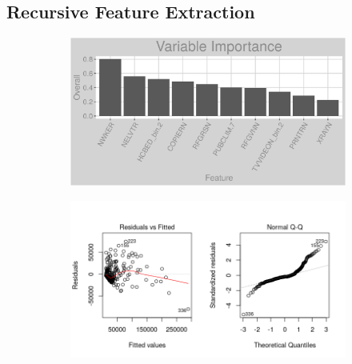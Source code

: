 \subsection{Recursive Feature Extraction}
\label{appendix:district_heat:rfe}
\begin{figure}[h]
\centering
\begin{subfigure}{1\textwidth}
\centering
\includegraphics[width=.99\textwidth, height=0.3\textheight]{Images/district_heat_rfe_vars.png}
\end{subfigure}
\begin{subfigure}{1\textwidth}
\centering
\includegraphics[width=.99\textwidth, height=0.475\textheight]{Images/district_heat_rfe_res_1.png}
\end{subfigure}
\end{figure}
\FloatBarrier
\newpage
